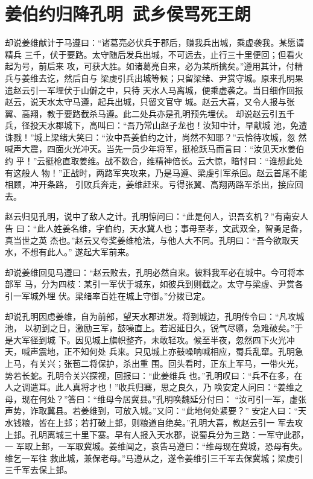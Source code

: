 \chapter{姜伯约归降孔明~武乡侯骂死王朗}

却说姜维献计于马遵曰：“诸葛亮必伏兵于郡后，赚我兵出城，乘虚袭我。某愿请精兵
三千，伏于要路。太守随后发兵出城，不可远去，止行三十里便回；但看火起为号，前后来
攻，可获大胜。如诸葛亮自来，必为某所擒矣。”遵用其计，付精兵与姜维去讫，然后自与
梁虔引兵出城等候；只留梁绪、尹赏守城。原来孔明果遣赵云引一军埋伏于山僻之中，只待
天水人马离城，便乘虚袭之。当日细作回报赵云，说天水太守马遵，起兵出城，只留文官守
城。赵云大喜，又令人报与张翼、高翔，教于要路截杀马遵。此二处兵亦是孔明预先埋伏。
却说赵云引五千兵，径投天水郡城下，高叫曰：“吾乃常山赵子龙也！汝知中计，早献城
池，免遭诛戮！”城上梁绪大笑曰：“汝中吾姜伯约之计，尚然不知耶？”云恰待攻城，忽
然喊声大震，四面火光冲天。当先一员少年将军，挺枪跃马而言曰：“汝见天水姜伯约
乎！”云挺枪直取姜维。战不数合，维精神倍长。云大惊，暗忖曰：“谁想此处有这般人
物！”正战时，两路军夹攻来，乃是马遵、梁虔引军杀回。赵云首尾不能相顾，冲开条路，
引败兵奔走，姜维赶来。亏得张翼、高翔两路军杀出，接应回去。

赵云归见孔明，说中了敌人之计。孔明惊问曰：“此是何人，识吾玄机？”有南安人告
曰：“此人姓姜名维，字伯约，天水冀人也；事母至孝，文武双全，智勇足备，真当世之英
杰也。”赵云又夸奖姜维枪法，与他人大不同。孔明曰：“吾今欲取天水，不想有此人。”
遂起大军前来。

却说姜维回见马遵曰：“赵云败去，孔明必然自来。彼料我军必在城中。今可将本部军
马，分为四枝：某引一军伏于城东，如彼兵到则截之。太守与梁虚、尹赏各引一军城外埋
伏。梁绪率百姓在城上守御。”分拨已定。

却说孔明因虑姜维，自为前部，望天水郡进发。将到城边，孔明传令曰：“凡攻城池，
以初到之日，激励三军，鼓噪直上。若迟延日久，锐气尽隳，急难破矣。”于是大军径到城
下。因见城上旗帜整齐，未敢轻攻。候至半夜，忽然四下火光冲天，喊声震地，正不知何处
兵来。只见城上亦鼓噪呐喊相应，蜀兵乱窜。孔明急上马，有关兴；张苞二将保护，杀出重
围。回头看时，正东上军马，一带火光，势若长蛇。孔明令关兴探视，回报曰：“此姜维兵
也。”孔明叹曰：“兵不在多，在人之调遣耳。此人真将才也！”收兵归寨，思之良久，乃
唤安定人问曰：“姜维之母，现在何处？”答曰：“维母今居冀县。”孔明唤魏延分付曰：
“汝可引一军，虚张声势，诈取冀县。若姜维到，可放入城。”又问：“此地何处紧要？”
安定人曰：“天水钱粮，皆在上邽；若打破上邽，则粮道自绝矣。”孔明大喜，教赵云引一
军去攻上邽。孔明离城三十里下寨。早有人报入天水郡，说蜀兵分为三路：一军守此郡，一
军取上邽，一军取冀城。姜维闻之，哀告马遵曰：“维母现在冀城，恐母有失。维乞一军往
救此城，兼保老母。”马遵从之，遂令姜维引三千军去保冀城；梁虔引三千军去保上邽。

